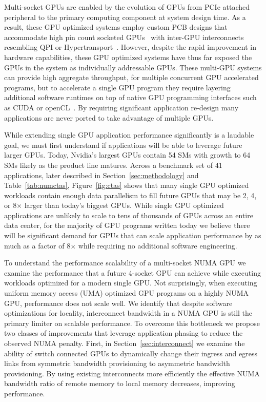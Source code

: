 Multi-socket GPUs are enabled by the evolution of GPUs from PCIe attached 
peripheral to the primary computing component at system design time.  As a 
result, these GPU optimized systems employ custom PCB designs that accommodate 
high pin count socketed GPUs~\cite{dgx} with inter-GPU interconnects resembling 
QPI or Hypertransport~\cite{NVLINK,INTELQPI,AMDHT}.  However, despite the rapid 
improvement in hardware capabilities, these GPU optimized systems have 
thus far exposed the GPUs in the system as individually addressable GPUs. These
multi-GPU systems can provide high aggregate throughput, for multiple concurrent
GPU accelerated programs, but to accelerate a single GPU program they
require layering additional software runtimes on top of native GPU programming 
interfaces such as CUDA or openCL~\cite{CUDA,OPENCL}. By requiring significant
application re-design many applications are never ported to take advantage
of multiple GPUs.

While extending single GPU application performance significantly is a laudable
goal, we must first understand if applications will be able to leverage future
larger GPUs.  Today, Nvidia's largest GPUs contain 54 SMs with growth to 64 SMs
likely as the product line matures. Across a benchmark set of 41 applications,
later described in Section~\ref{sec:methodology} and Table~\ref{tab:numctas},
Figure~\ref{fig:ctas} shows that many single GPU optimized workloads contain enough data 
parallelism 
to fill future GPUs that may be 2, 4, or 8$\times$ larger than today's biggest
GPUs.  While single GPU optimized applications are unlikely to scale to tens
of thousands of GPUs across an entire data center, for the majority of GPU
programs written today we believe there will be significant demand for GPUs that
can scale application performance by as much as a factor of 8$\times$ 
while requiring no additional software engineering.

To understand the performance scalability of a multi-socket NUMA GPU we examine 
the performance that a future 4-socket GPU can achieve while executing 
workloads optimized for a modern single GPU. Not surprisingly, when executing 
uniform memory access (UMA) optimized GPU programs on a highly NUMA GPU, 
performance does not scale well.  We identify that despite software 
optimizations for locality, interconnect bandwidth in a NUMA GPU is still the 
primary limiter on scalable performance.  To overcome this bottleneck we propose 
two classes of improvements that leverage application phasing to reduce the 
observed NUMA penalty.  First, in Section~\ref{sec:interconnect} we examine the 
ability of switch connected GPUs to dynamically change their ingress and egress 
links from symmetric bandwidth provisioning to asymmetric bandwidth 
provisioning.  By using existing interconnects more efficiently the effective 
NUMA bandwidth ratio of remote memory to local memory decreases, improving 
performance.


